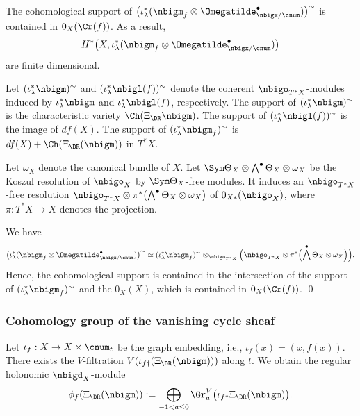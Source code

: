 \documentclass[a4,10pt]{article}
\begin{document}
\begin{lem}
\label{lem;24.6.25.10}
The cohomological support of 
$\bigl(
\iota_{\lambda}^{\ast}(\nbigm_f\otimes\Omegatilde^{\bullet}_{\nbigx/\cnum})
\bigr)^{\sim}$
is contained in $0_X(\Cr(f))$.
As a result,
\[
H^{\ast}\bigl(
X,\iota_{\lambda}^{\ast}(\nbigm_f\otimes\Omegatilde^{\bullet}_{\nbigx/\cnum})
\bigr) 
\]
are finite dimensional.
\end{lem}
\pf
Let $(\iota_{\lambda}^{\ast}\nbigm)^{\sim}$
and $(\iota_{\lambda}^{\ast}\nbigl(f))^{\sim}$
denote the coherent $\nbigo_{T^{\ast}X}$-modules
induced by
$\iota_{\lambda}^{\ast}\nbigm$
and $\iota_{\lambda}^{\ast}\nbigl(f)$,
respectively.
The support of
$(\iota_{\lambda}^{\ast}\nbigm)^{\sim}$
is the characteristic variety $\Ch(\Xi_{\DR}\nbigm)$.
The support of 
$(\iota_{\lambda}^{\ast}\nbigl(f))^{\sim}$
is the image of $df(X)$.
The support of
$(\iota_{\lambda}^{\ast}\nbigm_f)^{\sim}$
is $df(X)+\Ch(\Xi_{\DR}(\nbigm))$ in $T^{\ast}X$.


Let $\omega_X$ denote the canonical bundle of $X$.
Let 
$\Sym\Theta_X
 \otimes \bigwedge^{\bullet}\Theta_X
 \otimes\omega_X$
be the Koszul resolution of $\nbigo_X$
by $\Sym\Theta_X$-free modules.
It induces an $\nbigo_{T^{\ast}X}$-free resolution
$\nbigo_{T^{\ast}X}\otimes
\pi^{\ast}\bigl(
\bigwedge^{\bullet}\Theta_X\otimes\omega_X\bigr)$
of $0_{X\ast}(\nbigo_X)$,
where $\pi:T^{\ast}X\to X$ denotes the projection.

We have
\[
\bigl(
\iota_{\lambda}^{\ast}(\nbigm_f\otimes\Omegatilde^{\bullet}_{\nbigx/\cnum})
\bigr)^{\sim}
\simeq
(\iota_{\lambda}^{\ast}\nbigm_f)^{\sim}
\otimes_{\nbigo_{T^{\ast}X}}
\Bigl(
\nbigo_{T^{\ast}X}\otimes
\pi^{\ast}\Bigl(
\bigwedge^{\bullet} \Theta_X\otimes\omega_X
\Bigr)
\Bigr).
\]
Hence, the cohomological support is contained in
the intersection of
the support of 
$(\iota_{\lambda}^{\ast}\nbigm_f)^{\sim}$
and the $0_X(X)$,
which is contained in $0_X(\Cr(f))$.
\hfill\qed

\subsubsection{Cohomology group of the vanishing cycle sheaf}

Let $\iota_f:X\to X\times\cnum_t$
be the graph embedding,
i.e.,
$\iota_f(x)=(x,f(x))$.
There exists the $V$-filtration
$V(\iota_{f\dagger}(\Xi_{\DR}(\nbigm)))$
along $t$.
We obtain the regular holonomic $\nbigd_X$-module
\[
 \phi_f(\Xi_{\DR}(\nbigm))
:=\bigoplus_{-1< a\leq 0}
 \Gr^V_a\bigl(
 \iota_{f\dagger}\Xi_{\DR}(\nbigm)
 \bigr).
\]
\end{document}
